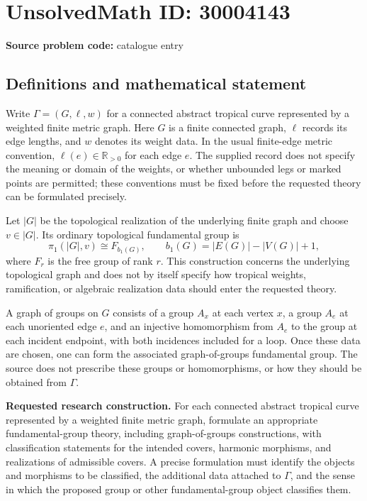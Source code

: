 \documentclass[11pt]{article}
\newcommand{\R}{\mathbb{R}}
\begin{document}
\section*{UnsolvedMath ID: 30004143}
\textbf{Source problem code:} catalogue entry
\subsection{Definitions and mathematical statement}
Write \(\Gamma=(G,\ell,w)\) for a connected abstract tropical curve represented by a weighted finite metric graph. Here \(G\) is a finite connected graph, \(\ell\) records its edge lengths, and \(w\) denotes its weight data. In the usual finite-edge metric convention, \(\ell(e)\in\R_{>0}\) for each edge \(e\). The supplied record does not specify the meaning or domain of the weights, or whether unbounded legs or marked points are permitted; these conventions must be fixed before the requested theory can be formulated precisely.

Let \(|G|\) be the topological realization of the underlying finite graph and choose \(v\in |G|\). Its ordinary topological fundamental group is
\[
\pi_1(|G|,v)\cong F_{b_1(G)},\qquad b_1(G)=|E(G)|-|V(G)|+1,
\]
where \(F_r\) is the free group of rank \(r\). This construction concerns the underlying topological graph and does not by itself specify how tropical weights, ramification, or algebraic realization data should enter the requested theory.

A graph of groups on \(G\) consists of a group \(A_x\) at each vertex \(x\), a group \(A_e\) at each unoriented edge \(e\), and an injective homomorphism from \(A_e\) to the group at each incident endpoint, with both incidences included for a loop. Once these data are chosen, one can form the associated graph-of-groups fundamental group. The source does not prescribe these groups or homomorphisms, or how they should be obtained from \(\Gamma\).

\textbf{Requested research construction.} For each connected abstract tropical curve represented by a weighted finite metric graph, formulate an appropriate fundamental-group theory, including graph-of-groups constructions, with classification statements for the intended covers, harmonic morphisms, and realizations of admissible covers. A precise formulation must identify the objects and morphisms to be classified, the additional data attached to \(\Gamma\), and the sense in which the proposed group or other fundamental-group object classifies them.
\end{document}
